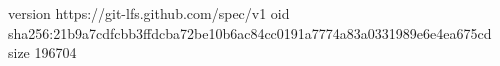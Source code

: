 version https://git-lfs.github.com/spec/v1
oid sha256:21b9a7cdfcbb3ffdcba72be10b6ac84cc0191a7774a83a0331989e6e4ea675cd
size 196704
